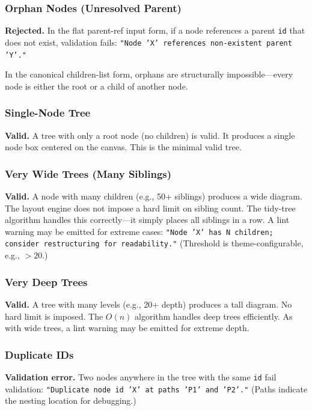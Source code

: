 \subsubsection{Orphan Nodes (Unresolved Parent)}

\textbf{Rejected.} In the flat parent-ref input form, if a node references a parent \texttt{id} that does not exist, validation fails: \texttt{"Node 'X' references non-existent parent 'Y'."}

In the canonical children-list form, orphans are structurally impossible---every node is either the root or a child of another node.

\subsubsection{Single-Node Tree}

\textbf{Valid.} A tree with only a root node (no children) is valid. It produces a single node box centered on the canvas. This is the minimal valid tree.

\subsubsection{Very Wide Trees (Many Siblings)}

\textbf{Valid.} A node with many children (e.g., 50+ siblings) produces a wide diagram. The layout engine does not impose a hard limit on sibling count. The tidy-tree algorithm handles this correctly---it simply places all siblings in a row. A lint warning may be emitted for extreme cases: \texttt{"Node 'X' has N children; consider restructuring for readability."} (Threshold is theme-configurable, e.g., $>20$.)

\subsubsection{Very Deep Trees}

\textbf{Valid.} A tree with many levels (e.g., 20+ depth) produces a tall diagram. No hard limit is imposed. The $O(n)$ algorithm handles deep trees efficiently. As with wide trees, a lint warning may be emitted for extreme depth.

\subsubsection{Duplicate IDs}

\textbf{Validation error.} Two nodes anywhere in the tree with the same \texttt{id} fail validation: \texttt{"Duplicate node id 'X' at paths 'P1' and 'P2'."} (Paths indicate the nesting location for debugging.)

